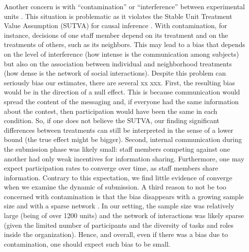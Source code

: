 \documentclass[11pt, titlepage]{article}
\begin{document}
Another concern is with ``contamination'' or ``interference'' between
experimental units \citep{rosenbaum2007interference}. This situation is
problematic as it violates the Stable Unit Treatment Value Assumption
(SUTVA) for causal inference \citep{rubin1974estimating}. With
contamination, for instance, decisions of one staff member depend on its
treatment and on the treatments of others, such as its neighbors. This
may lead to a bias that depends on the level of interference (how
intense is the communication among subjects) but also on the association
between individual and neighborhood treatments (how dense is the network
of social interactions). Despite this problem can seriously bias our
estimates, there are several xx xxx. First, the resulting bias would be
in the direction of a null effect. This is because communication would
spread the content of the messaging and, if everyone had the same
information about the contest, then participation would have been the
same in each condition. So, if one does not believe the SUTVA, our
finding significant differences between treatments can still be
interpreted in the sense of a lower bound (the true effect might be
bigger). Second, internal communication during the submission phase was
likely small: staff members competing against one another had only weak
incentives for information sharing. Furthermore, one may expect
participation rates to converge over time, as staff members share
information. Contrary to this expectation, we find little evidence of
converge when we examine the dynamic of submission. A third reason to
not be too concerned with contamination is that the bias disappears with
a growing sample size and with a sparse network
\citep{forastiere2016identification}. In our setting, the sample size
was relatively large (being of over 1200 units) and the network of
interactions was likely sparse (given the limited number of participants
and the diversity of tasks and roles inside the organization). Hence,
and overall, even if there was a bias due to contamination, one should
expect such bias to be small.
\end{document}
